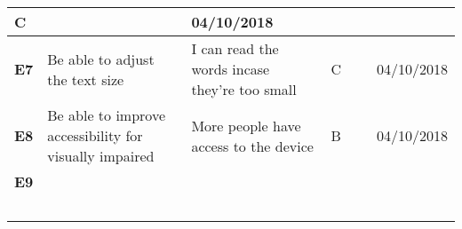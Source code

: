 \documentclass[a4paper]{article}
\begin{document}
\begin{flushleft}
\begin{supertabular}{|m{1.601cm}|m{3.148cm}|m{3.146cm}|m{2.414cm}|m{2.271cm}|m{2.389cm}|}
{ C} &
~
 &
{ 04/10/2018}\\\hline
{\bfseries E7} &
{ Be able to adjust the text size} &
{ I can read the words incase they're too small} &
{ C} &
~
 &
{ 04/10/2018}\\\hline
{\bfseries E8} &
{ Be able to improve accessibility for visually impaired} &
{ More people have access to the device} &
{ B} &
~
 &
{ 04/10/2018}\\\hline
{\bfseries E9} &
~
 &
~
 &
~
 &
~
 &
~
\\\hline
~
 &
~
 &
~
 &
~
 &
~
 &
~
\\\hline
\end{supertabular}
\end{flushleft}

\bigskip
\end{document}
